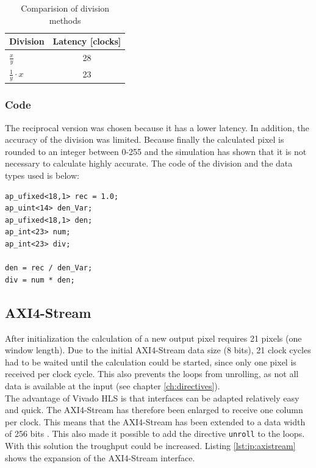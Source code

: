 \begin{table}[tb!]
    \centering
    \begin{tabular}{l c}
        \toprule
        Division & Latency [clocks]  \\
        \midrule
        $\frac{x}{y}$ & 28 
        \\
        $\frac{1}{y} \cdot x$ & 23 
        \\
        \bottomrule
    \end{tabular}
    \caption{Comparision of division methods}
    \label{tab:c_div}
\end{table}

\subsubsection*{Code}
The reciprocal version was chosen because it has a lower latency. In addition,
the accuracy of the division was limited. Because finally the calculated pixel
is rounded to an integer between 0-255 and the simulation has shown that it is
not necessary to calculate highly accurate. The code of the division and the data types used is below:

\begin{minipage}{\textwidth}
\begin{lstlisting}[style=CStyle, caption=Calculation of the division for the Wallis filter, label=lst:division]
ap_ufixed<18,1> rec = 1.0;
ap_uint<14> den_Var;
ap_ufixed<18,1> den;
ap_int<23> num;
ap_int<23> div;

den = rec / den_Var;
div = num * den;
\end{lstlisting}
\end{minipage}


\subsection{AXI4-Stream} \label{ch:ip:axi}
After initialization the calculation of a new output pixel
requires 21 pixels (one window length). Due to the initial AXI4-Stream data size
(8 bits), 21 clock cycles had to be waited until the calculation could be
started, since only one pixel is received per clock cycle. This also prevents
the loops from unrolling, as not all data is available at the input (see chapter \ref{ch:directives}). \\
The advantage of Vivado HLS is that interfaces can be adapted relatively easy
and quick. The AXI4-Stream has therefore been enlarged to receive one column per
clock. This means that the AXI4-Stream has been extended to a data width of 256
bits \cite{axi_stream}. This also made it possible to add the directive 
\texttt{unroll} to the loops. With this solution the troughput could be
increased. Listing \ref{lst:ip:axistream} shows the expansion of the AXI4-Stream interface.

